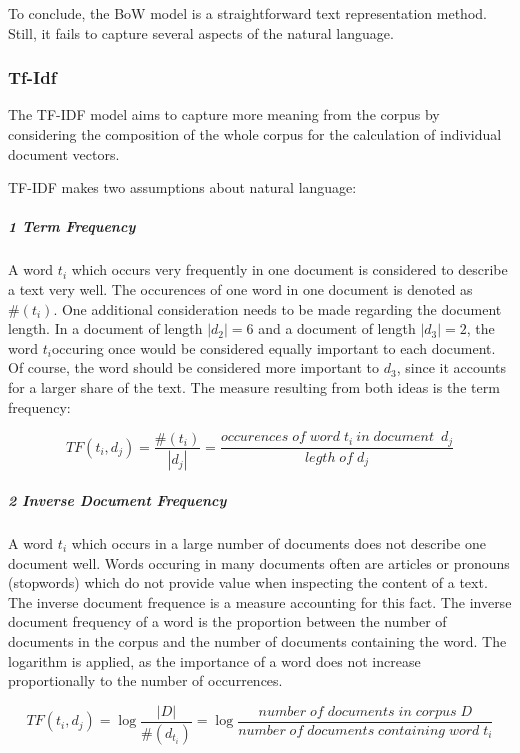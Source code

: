             To conclude, the \ac{BoW} model is a straightforward text representation method. Still, it fails to capture several aspects of the natural language.
            
            \subsubsection{Tf-Idf}
            The \ac{TF-IDF} model aims to capture more meaning from the corpus by considering the composition of the whole corpus for the calculation of individual document vectors.
            
            \ac{TF-IDF} makes two assumptions about natural language:
            
            \subparagraph{1 Term Frequency}
            
            A word $t_{i} $ which occurs very frequently in one document is considered to describe a text very well. The occurences of one word in one document is denoted as $ \#( t_{i}) $.
            One additional consideration needs to be made regarding the document length. In a document of length $ |d_{2}| = 6 $ and a document of length  $ |d_{3}| = 2 $, the word $ t_{i} $occuring once would be considered equally important to each document. Of course, the word should be considered more important to $ d_{3} $, since it accounts for a larger share of the text. The measure resulting from both ideas is the term frequency:
            
            \[ TF(t_{i}, d_{j}) =   \dfrac{\#( t_{i})}{|d_{j}|} = \dfrac{occurences \; of \; word \; t_{i} \: in \; document \;\:   d_{j}}{legth \; of \; d_{j}} \]
            
            \subparagraph{2 Inverse Document Frequency}
            A word $t_{i} $ which occurs in a large number of documents does not describe one document well. Words occuring in many documents often are articles or pronouns (stopwords) which do not provide value when inspecting the content of a text. The inverse document frequence is a measure accounting for this fact. The inverse document frequency of a word is the proportion between the number of documents in the corpus and the number of documents containing the word. The logarithm is applied, as the importance of a word does not increase proportionally to the number of occurrences.
        
            
            \[ TF(t_{i}, d_{j}) = \log \dfrac{|D|}{\#(d_{t_{i}}) } =  \log \dfrac{number \;  of\;  documents \;  in \; corpus \; D}{ number \; of \; documents \; containing \; word \; t_{i}} \]
            
